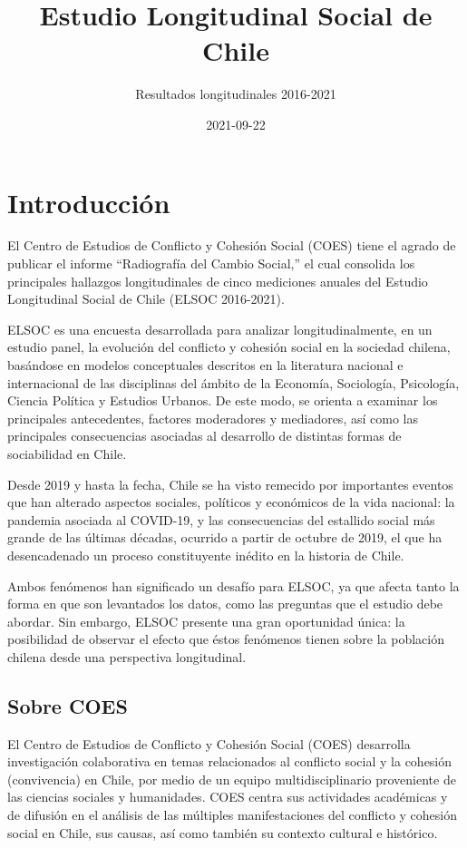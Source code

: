 \documentclass[
  12pt,
  openany]{book}
\title{Estudio Longitudinal Social de Chile}
\subtitle{Resultados longitudinales 2016-2021}
\author{}
\date{\vspace{-2.5em}2021-09-22}
\begin{document}
\maketitle

\listoftables
\listoffigures
{}
\hypertarget{introducciuxf3n}{%
\chapter{Introducción}\label{introducciuxf3n}}

El Centro de Estudios de Conflicto y Cohesión Social (COES) tiene el agrado de publicar el informe ``Radiografía del Cambio Social,'' el cual consolida los principales hallazgos longitudinales de cinco mediciones anuales del Estudio Longitudinal Social de Chile (ELSOC 2016-2021).

ELSOC es una encuesta desarrollada para analizar longitudinalmente, en un estudio panel, la evolución del conflicto y cohesión social en la sociedad chilena, basándose en modelos conceptuales descritos en la literatura nacional e internacional de las disciplinas del ámbito de la Economía, Sociología, Psicología, Ciencia Política y Estudios Urbanos. De este modo, se orienta a examinar los principales antecedentes, factores moderadores y mediadores, así como las principales consecuencias asociadas al desarrollo de distintas formas de sociabilidad en Chile.

Desde 2019 y hasta la fecha, Chile se ha visto remecido por importantes eventos que han alterado aspectos sociales, políticos y económicos de la vida nacional: la pandemia asociada al COVID-19, y las consecuencias del estallido social más grande de las últimas décadas, ocurrido a partir de octubre de 2019, el que ha desencadenado un proceso constituyente inédito en la historia de Chile.

Ambos fenómenos han significado un desafío para ELSOC, ya que afecta tanto la forma en que son levantados los datos, como las preguntas que el estudio debe abordar. Sin embargo, ELSOC presente una gran oportunidad única: la posibilidad de observar el efecto que éstos fenómenos tienen sobre la población chilena desde una perspectiva longitudinal.

\hypertarget{sobre-coes}{%
\section{Sobre COES}\label{sobre-coes}}

El Centro de Estudios de Conflicto y Cohesión Social (COES) desarrolla investigación colaborativa en temas relacionados al conflicto social y la cohesión (convivencia) en Chile, por medio de un equipo multidisciplinario proveniente de las ciencias sociales y humanidades. COES centra sus actividades académicas y de difusión en el análisis de las múltiples manifestaciones del conflicto y cohesión social en Chile, sus causas, así como también su contexto cultural e histórico.
\end{document}
